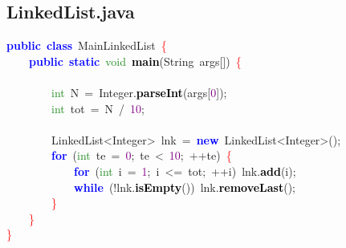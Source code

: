 \subsection{LinkedList.java}
\noindent
\mbox{}\textbf{\textcolor{Blue}{public}}\ \textbf{\textcolor{Blue}{class}}\ \textcolor{TealBlue}{MainLinkedList}\ \textcolor{Red}{\{} \\
\mbox{}\ \ \ \ \textbf{\textcolor{Blue}{public}}\ \textbf{\textcolor{Blue}{static}}\ \textcolor{ForestGreen}{void}\ \textbf{\textcolor{Black}{main}}\textcolor{BrickRed}{(}\textcolor{TealBlue}{String}\ args\textcolor{BrickRed}{[])}\ \textcolor{Red}{\{} \\
\mbox{}\ \ \ \ \ \ \ \  \\
\mbox{}\ \ \ \ \ \ \ \ \textcolor{ForestGreen}{int}\ N\ \textcolor{BrickRed}{=}\ Integer\textcolor{BrickRed}{.}\textbf{\textcolor{Black}{parseInt}}\textcolor{BrickRed}{(}args\textcolor{BrickRed}{[}\textcolor{Purple}{0}\textcolor{BrickRed}{]);} \\
\mbox{}\ \ \ \ \ \ \ \ \textcolor{ForestGreen}{int}\ tot\ \textcolor{BrickRed}{=}\ N\ \textcolor{BrickRed}{/}\ \textcolor{Purple}{10}\textcolor{BrickRed}{;} \\
\mbox{} \\
\mbox{}\ \ \ \ \ \ \ \ \textcolor{TealBlue}{LinkedList\textless{}Integer\textgreater{}}\ lnk\ \textcolor{BrickRed}{=}\ \textbf{\textcolor{Blue}{new}}\ LinkedList\textcolor{BrickRed}{\textless{}}Integer\textcolor{BrickRed}{\textgreater{}();} \\
\mbox{}\ \ \ \ \ \ \ \ \textbf{\textcolor{Blue}{for}}\ \textcolor{BrickRed}{(}\textcolor{ForestGreen}{int}\ te\ \textcolor{BrickRed}{=}\ \textcolor{Purple}{0}\textcolor{BrickRed}{;}\ te\ \textcolor{BrickRed}{\textless{}}\ \textcolor{Purple}{10}\textcolor{BrickRed}{;}\ \textcolor{BrickRed}{++}te\textcolor{BrickRed}{)}\ \textcolor{Red}{\{} \\
\mbox{}\ \ \ \ \ \ \ \ \ \ \ \ \textbf{\textcolor{Blue}{for}}\ \textcolor{BrickRed}{(}\textcolor{ForestGreen}{int}\ i\ \textcolor{BrickRed}{=}\ \textcolor{Purple}{1}\textcolor{BrickRed}{;}\ i\ \textcolor{BrickRed}{\textless{}=}\ tot\textcolor{BrickRed}{;}\ \textcolor{BrickRed}{++}i\textcolor{BrickRed}{)}\ lnk\textcolor{BrickRed}{.}\textbf{\textcolor{Black}{add}}\textcolor{BrickRed}{(}i\textcolor{BrickRed}{);} \\
\mbox{}\ \ \ \ \ \ \ \ \ \ \ \ \textbf{\textcolor{Blue}{while}}\ \textcolor{BrickRed}{(!}lnk\textcolor{BrickRed}{.}\textbf{\textcolor{Black}{isEmpty}}\textcolor{BrickRed}{())}\ lnk\textcolor{BrickRed}{.}\textbf{\textcolor{Black}{removeLast}}\textcolor{BrickRed}{();} \\
\mbox{}\ \ \ \ \ \ \ \ \textcolor{Red}{\}} \\
\mbox{}\ \ \ \ \textcolor{Red}{\}} \\
\mbox{}\textcolor{Red}{\}} \\
\mbox{}

